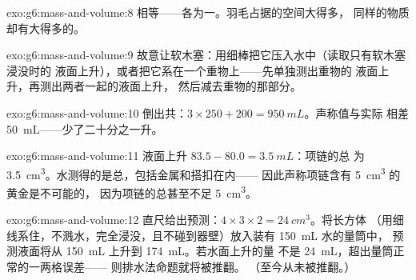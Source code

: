 \begin{solution}{exo:g6:mass-and-volume:8}
相等——各为一。羽毛占据的空间大得多，
同样的物质却有大得多的。
\end{solution}

\begin{solution}{exo:g6:mass-and-volume:9}
故意让软木塞：用细棒把它压入水中（读取只有软木塞浸没时的
液面上升），或者把它系在一个重物上——先单独测出重物的
液面上升，再测出两者一起的液面上升，
然后减去重物的那部分。
\end{solution}

\begin{solution}{exo:g6:mass-and-volume:10}
倒出共：$3 \times 250 + 200 = \qty{950}{mL}$。声称值与实际
相差 \qty{50}{mL}——少了二十分之一升。
\end{solution}

\begin{solution}{exo:g6:mass-and-volume:11}
液面上升 $83.5 - 80.0 = \qty{3.5}{mL}$：项链的总
为 \qty{3.5}{cm^3}。水测得的是总，包括金属和搭扣在内——
因此声称项链含有 \qty{5}{cm^3} 的黄金是不可能的，
因为项链的总甚至不足 \qty{5}{cm^3}。
\end{solution}

\begin{solution}{exo:g6:mass-and-volume:12}
直尺给出预测：$4 \times 3 \times 2 = \qty{24}{cm^3}$。将长方体
（用细线系住，不溅水，完全浸没，且不碰到器壁）放入装有 \qty{150}{mL} 水的量筒中，
预测液面将从 \qty{150}{mL} 上升到 \qty{174}{mL}。若水面上升的量
不是 \qty{24}{mL}，超出量筒正常的一两格误差——
则排水法命题就将被推翻。
（至今从未被推翻。）
\end{solution}

